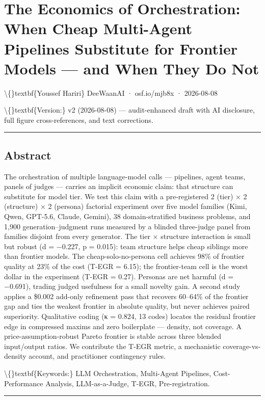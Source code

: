 \documentclass[11pt,a4paper]{article}
\begin{document}
\section{The Economics of Orchestration: When Cheap Multi-Agent Pipelines Substitute for Frontier Models — and When They Do Not}

\textbackslash\{\}textbf\{Youssef Hariri\}
DeeWaanAI · osf.io/mjb8x · 2026-08-08

\textbackslash\{\}textbf\{Version:\} v2 (2026-08-08) — audit-enhanced draft with AI disclosure,
full figure cross-references, and text corrections.

\hrule


\subsection{Abstract}

The orchestration of multiple language-model calls — pipelines, agent teams,
panels of judges — carries an implicit economic claim: that structure can
substitute for model tier. We test this claim with a pre-registered
2 (tier) × 2 (structure) × 2 (persona) factorial experiment over five model
families (Kimi, Qwen, GPT-5.6, Claude, Gemini), 38 domain-stratified business
problems, and 1,900 generation–judgment runs measured by a blinded three-judge
panel from families disjoint from every generator. The tier × structure
interaction is small but robust (d = −0.227, p = 0.015): team structure helps
cheap siblings more than frontier models. The cheap-solo-no-persona cell
achieves 98\% of frontier quality at 23\% of the cost (T-EGR = 6.15); the
frontier-team cell is the worst dollar in the experiment (T-EGR = 0.27).
Personas are net harmful (d = −0.691), trading judged usefulness for a small
novelty gain. A second study applies a \$0.002 add-only refinement pass that
recovers 60–64\% of the frontier gap and ties the weakest frontier in absolute
quality, but never achieves paired superiority. Qualitative coding (κ = 0.824,
13 codes) locates the residual frontier edge in compressed maxims and zero
boilerplate — density, not coverage. A price-assumption-robust Pareto frontier
is stable across three blended input/output ratios. We contribute the T-EGR
metric, a mechanistic coverage-vs-density account, and practitioner contingency
rules.

\textbackslash\{\}textbf\{Keywords:\} LLM Orchestration, Multi-Agent Pipelines, Cost-Performance
Analysis, LLM-as-a-Judge, T-EGR, Pre-registration.

\hrule
\end{document}
